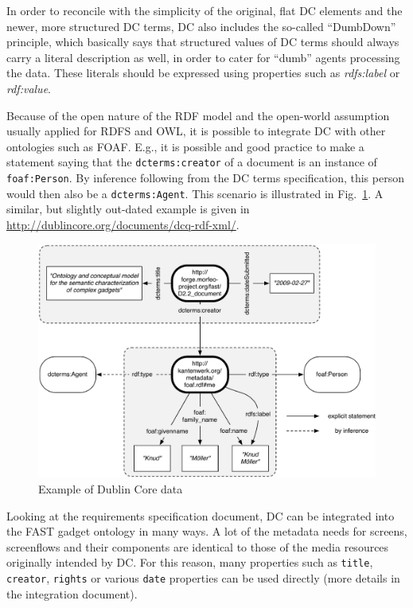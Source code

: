 \documentclass{fast_latex}
\begin{document}
In order to reconcile with the simplicity of the original, flat DC elements and the newer, more structured DC terms, DC also includes the so-called ``DumbDown'' principle, which basically says that structured values of DC terms should always carry a literal description as well, in order to cater for ``dumb'' agents processing the data. These literals should be expressed using properties such as \emph{rdfs:label} or \emph{rdf:value}.

Because of the open nature of the RDF model and the open-world assumption usually applied for RDFS and OWL, it is possible to integrate DC with other ontologies such as FOAF. E.g., it is possible and good practice to make a statement saying that the \texttt{dcterms:creator} of a document is an instance of \texttt{foaf:Person}. By inference following from the DC terms specification, this person would then also be a \texttt{dcterms:Agent}. This scenario is illustrated in Fig.~\ref{fig:dcterms_example}. A similar, but slightly out-dated example is given in \url{http://dublincore.org/documents/dcq-rdf-xml/}.

\begin{figure}
  \begin{center}
    \includegraphics[width=\linewidth]{images/dcterms_example.pdf}
    \caption{Example of Dublin Core data}
    \label{fig:dcterms_example}
  \end{center}
\end{figure}


Looking at the requirements specification document, DC can be integrated into the FAST gadget ontology in many ways. A lot of the metadata needs for screens, screenflows and their components are identical to those of the media resources originally intended by DC. For this reason, many properties such as \texttt{title}, \texttt{creator}, \texttt{rights} or various \texttt{date} properties can be used directly (more details in the integration document). 
\end{document}
